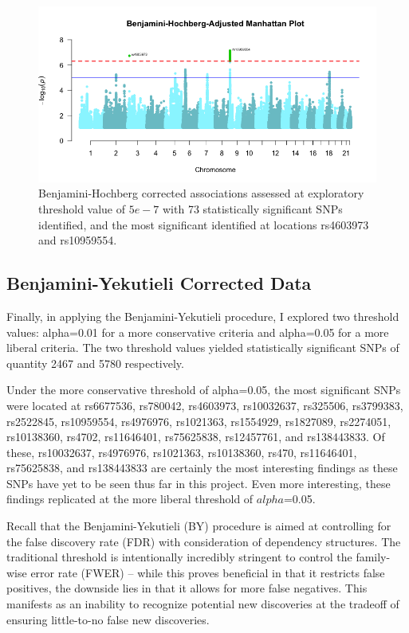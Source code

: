 \documentclass[12pt]{article}
\begin{document}
\begin{figure}
    \centering
    \includegraphics[width=1\linewidth]{Thesis_BHCorrectedManhattanPlot.png}
    \caption{Benjamini-Hochberg corrected associations assessed at exploratory threshold value of $5e-7$ with 73 statistically significant SNPs identified, and the most significant identified at locations rs4603973 and rs10959554.}
    \label{fig:enter-label}
\end{figure}
\clearpage


\subsection{Benjamini-Yekutieli Corrected Data}
Finally, in applying the Benjamini-Yekutieli procedure, I explored two threshold values: alpha=0.01 for a more conservative criteria and alpha=0.05 for a more liberal criteria. The two threshold values yielded statistically significant SNPs of quantity 2467 and 5780 respectively. \par

Under the more conservative threshold of alpha=0.05, the most significant SNPs were located at rs6677536, rs780042, rs4603973, rs10032637, rs325506, rs3799383, rs2522845, rs10959554, rs4976976, rs1021363, rs1554929, rs1827089, rs2274051, rs10138360, rs4702, rs11646401, rs75625838, rs12457761, and rs138443833. Of these, rs10032637, rs4976976, rs1021363, rs10138360, rs470, rs11646401, rs75625838, and rs138443833 are certainly the most interesting findings as these SNPs have yet to be seen thus far in this project. Even more interesting, these findings replicated at the more liberal threshold of $alpha$=0.05. \par

Recall that the Benjamini-Yekutieli (BY) procedure is aimed at controlling for the false discovery rate (FDR) with consideration of dependency structures. The traditional threshold is intentionally incredibly stringent to control the family-wise error rate (FWER) -- while this proves beneficial in that it restricts false positives, the downside lies in that it allows for more false negatives. This manifests as an inability to recognize potential new discoveries at the tradeoff of ensuring little-to-no false new discoveries. \par
\end{document}

